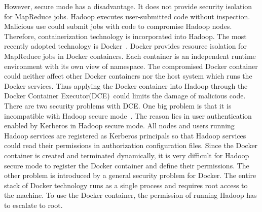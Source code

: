 However, secure mode has a disadvantage. It does not provide security isolation for MapReduce jobs. Hadoop executes user-submitted code without inspection. Malicious use could submit jobs with code to compromise Hadoop nodes. Therefore, containerization technology is incorporated into Hadoop. The most recently adopted technology is Docker~\cite{docker}. Docker provides resource isolation for MapReduce jobs in Docker containers. Each container is an independent runtime environment with its own view of namespace. The compromised Docker container could neither affect other Docker containers nor the host system which runs the Docker services. Thus applying the Docker container into Hadoop through the Docker Container Executor(DCE)~\cite{dce}could limits the damage of malicious code.
There are two security problems with DCE. One big problem is that it is incompatible with Hadoop secure mode~\cite{dce}. The reason lies in user authentication enabled by Kerberos in Hadoop secure mode. All nodes and users running Hadoop services are registered as Kerberos principals so that  Hadoop services could read their permissions in authorization configuration files. Since the Docker container is created and terminated dynamically, it is very difficult for Hadoop secure mode to register the Docker container and define their permissions. The other problem is introduced by a general security problem for Docker. The entire stack of Docker technology runs as a single process and requires root access to the machine. To use the Docker container, the permission of running Hadoop has to escalate to root.

